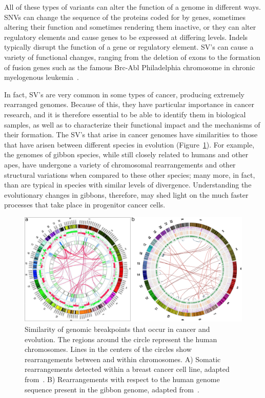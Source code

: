 \documentclass [11pt] {report}
\begin{document}
All of these types of variants can alter the function of a genome in different ways. SNVs can change the sequence of the proteins coded for by genes, sometimes altering their function and sometimes rendering them inactive, or they can alter regulatory elements and cause genes to be expressed at differing levels. Indels typically disrupt the function of a gene or regulatory element. SV's can cause a variety of functional changes, ranging from the deletion of exons to the formation of fusion genes such as the famous Brc-Abl Philadelphia chromosome in chronic myelogenous leukemia~\cite{Kurzrock:2003bz}. 

In fact, SV's are very common in some types of cancer, producing extremely rearranged genomes. Because of this, they have particular importance in cancer research, and it is therefore essential to be able to identify them in biological samples, as well as to characterize their functional impact and the mechanisms of their formation. The SV's that arise in cancer genomes have similarities to those that have arisen between different species in evolution (Figure~\ref{cancer_evolution_breakpoints}). For example, the genomes of gibbon species, while still closely related to humans and other apes, have undergone a variety of chromosomal rearrangements and other structural variations when compared to these other species; many more, in fact, than are typical in species with similar levels of divergence. Understanding the evolutionary changes in gibbons, therefore, may shed light on the much faster processes that take place in progenitor cancer cells.

\begin{figure}
\centering
\includegraphics[width=.9\textwidth]{figures/breakpoints_in_cancer_and_evolution.pdf}
\caption{Similarity of genomic breakpoints that occur in cancer and evolution. The regions around the circle represent the human chromosomes. Lines in the centers of the circles show rearrangements between and within chromosomes. A) Somatic rearrangements detected within a breast cancer cell line, adapted from~\cite{Hampton:2009fc}. B) Rearrangements with respect to the human genome sequence present in the gibbon genome, adapted from~\cite{Carbone:2009p1012}.}
\label{cancer_evolution_breakpoints}
\end{figure}
\end{document}
